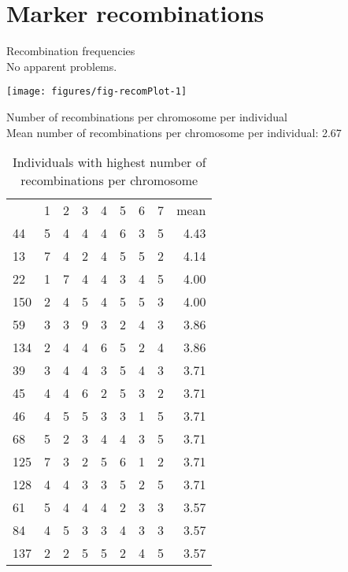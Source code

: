 \documentclass[a4paper,11pt]{article}\usepackage[]{graphicx}\usepackage[]{color}
\makeatletter
\def\maxwidth{ %
  \ifdim\Gin@nat@width>\linewidth
    \linewidth
  \else
    \Gin@nat@width
  \fi
}
\newenvironment{knitrout}{}{} %
\makeatother
\begin{document}
\newpage
\section{Marker recombinations}
Recombination frequencies\\
No apparent problems.

\begin{knitrout}
\color{fgcolor}

{\centering \texttt{[image: figures/fig-recomPlot-1]} 

}



\end{knitrout}
\newpage
Number of recombinations per chromosome per individual\\


Mean number of recombinations per chromosome per individual: 2.67%
\begin{table}[ht]
\begin{flushleft}
\caption{Individuals with highest number of
                     recombinations per chromosome} 
\label{recInd}
\begin{tabular}{lrrrrrrrr}
  & 1 & 2 & 3 & 4 & 5 & 6 & 7 & mean \\ 
 44 & 5 & 4 & 4 & 4 & 6 & 3 & 5 & 4.43 \\ 
  13 & 7 & 4 & 2 & 4 & 5 & 5 & 2 & 4.14 \\ 
  22 & 1 & 7 & 4 & 4 & 3 & 4 & 5 & 4.00 \\ 
  150 & 2 & 4 & 5 & 4 & 5 & 5 & 3 & 4.00 \\ 
  59 & 3 & 3 & 9 & 3 & 2 & 4 & 3 & 3.86 \\ 
  134 & 2 & 4 & 4 & 6 & 5 & 2 & 4 & 3.86 \\ 
  39 & 3 & 4 & 4 & 3 & 5 & 4 & 3 & 3.71 \\ 
  45 & 4 & 4 & 6 & 2 & 5 & 3 & 2 & 3.71 \\ 
  46 & 4 & 5 & 5 & 3 & 3 & 1 & 5 & 3.71 \\ 
  68 & 5 & 2 & 3 & 4 & 4 & 3 & 5 & 3.71 \\ 
  125 & 7 & 3 & 2 & 5 & 6 & 1 & 2 & 3.71 \\ 
  128 & 4 & 4 & 3 & 3 & 5 & 2 & 5 & 3.71 \\ 
  61 & 5 & 4 & 4 & 4 & 2 & 3 & 3 & 3.57 \\ 
  84 & 4 & 5 & 3 & 3 & 4 & 3 & 3 & 3.57 \\ 
  137 & 2 & 2 & 5 & 5 & 2 & 4 & 5 & 3.57 \\ 
  \end{tabular}
\end{flushleft}
\end{table}
\end{document}
